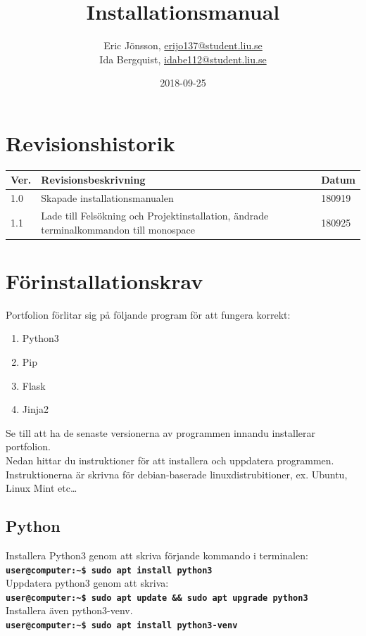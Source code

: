 \documentclass{TDP003mall}
\author{Eric Jönsson, \url{erijo137@student.liu.se}\\
  Ida Bergquist, \url{idabe112@student.liu.se}}
\title{Installationsmanual}
\date{2018-09-25}
\begin{document}
\projectpage
\section{Revisionshistorik}
\begin{table}[!h]
\begin{tabularx}{\linewidth}{|l|X|l|}
\hline
\textbf{Ver.} &\textbf{ Revisionsbeskrivning} &\textbf{ Datum}\\\hline
1.0 & Skapade installationsmanualen & 180919 \\\hline
1.1 & Lade till Felsökning och Projektinstallation, ändrade terminalkommandon till monospace & 180925 \\\hline
\end{tabularx}
\end{table}

\section{Förinstallationskrav}
Portfolion förlitar sig på följande program för att fungera korrekt:\\
\begin{enumerate}
\item Python3
\item Pip
\item Flask
\item Jinja2
\end{enumerate}
Se till att ha de senaste versionerna av programmen innandu installerar portfolion.\\
Nedan hittar du instruktioner för att installera och uppdatera programmen. Instruktionerna är skrivna för debian-baserade linuxdistrubitioner, ex. Ubuntu, Linux Mint etc\ldots
\subsection{Python}
Installera Python3 genom att skriva förjande kommando i terminalen:\\
\texttt{\textbf{\textcolor{terminalgreen}{user@computer}:\~{}\$ sudo apt install python3}}\\
Uppdatera python3 genom att skriva:\\
\texttt{\textbf{\textcolor{terminalgreen}{user@computer}:\~{}\$ sudo apt update \&\& sudo apt upgrade python3}}\\
Installera även python3-venv.\\
\texttt{\textbf{\textcolor{terminalgreen}{user@computer}:\~{}\$ sudo apt install python3-venv}}\\
\end{document}
